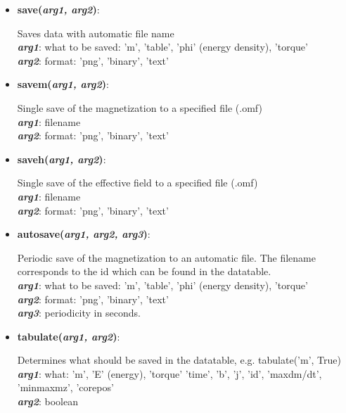 \begin{itemize}

 \item {\textbf{save(\textit{arg1, arg2})}:
				\flushright\parbox{0.9 \textwidth}{\vspace{-0.25cm} 
				Saves data with automatic file name\\
				\textbf{\textit{arg1}}: what to be saved: 'm', 'table', 'phi' (energy density), 'torque'\\
				\textbf{\textit{arg2}}: format: 'png', 'binary', 'text'
				}\flushleft}

 \item {\vspace{-0.4cm}\textbf{savem(\textit{arg1, arg2})}:
				\flushright\parbox{0.9 \textwidth}{\vspace{-0.25cm} 
				Single save of the magnetization to a specified file (.omf)\\
				\textbf{\textit{arg1}}: filename\\
				\textbf{\textit{arg2}}: format: 'png', 'binary', 'text'
				}\flushleft}

 \item {\vspace{-0.4cm}\textbf{saveh(\textit{arg1, arg2})}:
				\flushright\parbox{0.9 \textwidth}{\vspace{-0.25cm} 
				Single save of the effective field to a specified file (.omf)\\
				\textbf{\textit{arg1}}: filename\\
				\textbf{\textit{arg2}}: format: 'png', 'binary', 'text'
				}\flushleft}

 \item {\vspace{-0.4cm}\textbf{autosave(\textit{arg1, arg2, arg3})}:
				\flushright\parbox{0.9 \textwidth}{\vspace{-0.25cm} 
				Periodic save of the magnetization to an automatic file.  The filename corresponds to the id which can be found in the datatable.\\
				\textbf{\textit{arg1}}: what to be saved: 'm', 'table', 'phi' (energy density), 'torque'\\
				\textbf{\textit{arg2}}: format: 'png', 'binary', 'text'\\
				\textbf{\textit{arg3}}: periodicity in seconds.
				}\flushleft}

 \item {\vspace{-0.4cm}\textbf{tabulate(\textit{arg1, arg2})}:  
				\flushright\parbox{0.9 \textwidth}{\vspace{-0.25cm} 
				Determines what should be saved in the datatable, e.g. tabulate('m', True)\\
				\textbf{\textit{arg1}}: what: 'm', 'E' (energy), 'torque' 'time', 'b', 'j', 'id', 'maxdm/dt', 'minmaxmz', 'corepos'\\
				\textbf{\textit{arg2}}: boolean\\
				}\flushleft}


\end{itemize}
